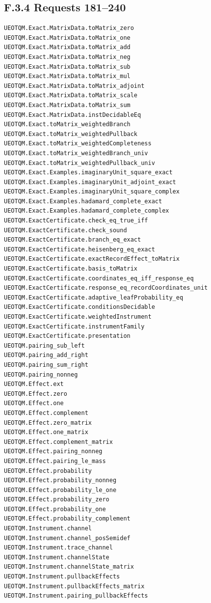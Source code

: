 \documentclass[
  11pt,
  oneside]{book}
\begin{document}
\subsection{F.3.4 Requests 181--240}

\begin{Verbatim}[breaklines,breakanywhere,fontsize=\scriptsize]
UEOTQM.Exact.MatrixData.toMatrix_zero
UEOTQM.Exact.MatrixData.toMatrix_one
UEOTQM.Exact.MatrixData.toMatrix_add
UEOTQM.Exact.MatrixData.toMatrix_neg
UEOTQM.Exact.MatrixData.toMatrix_sub
UEOTQM.Exact.MatrixData.toMatrix_mul
UEOTQM.Exact.MatrixData.toMatrix_adjoint
UEOTQM.Exact.MatrixData.toMatrix_scale
UEOTQM.Exact.MatrixData.toMatrix_sum
UEOTQM.Exact.MatrixData.instDecidableEq
UEOTQM.Exact.toMatrix_weightedBranch
UEOTQM.Exact.toMatrix_weightedPullback
UEOTQM.Exact.toMatrix_weightedCompleteness
UEOTQM.Exact.toMatrix_weightedBranch_univ
UEOTQM.Exact.toMatrix_weightedPullback_univ
UEOTQM.Exact.Examples.imaginaryUnit_square_exact
UEOTQM.Exact.Examples.imaginaryUnit_adjoint_exact
UEOTQM.Exact.Examples.imaginaryUnit_square_complex
UEOTQM.Exact.Examples.hadamard_complete_exact
UEOTQM.Exact.Examples.hadamard_complete_complex
UEOTQM.ExactCertificate.check_eq_true_iff
UEOTQM.ExactCertificate.check_sound
UEOTQM.ExactCertificate.branch_eq_exact
UEOTQM.ExactCertificate.heisenberg_eq_exact
UEOTQM.ExactCertificate.exactRecordEffect_toMatrix
UEOTQM.ExactCertificate.basis_toMatrix
UEOTQM.ExactCertificate.coordinates_eq_iff_response_eq
UEOTQM.ExactCertificate.response_eq_recordCoordinates_unit
UEOTQM.ExactCertificate.adaptive_leafProbability_eq
UEOTQM.ExactCertificate.conditionsDecidable
UEOTQM.ExactCertificate.weightedInstrument
UEOTQM.ExactCertificate.instrumentFamily
UEOTQM.ExactCertificate.presentation
UEOTQM.pairing_sub_left
UEOTQM.pairing_add_right
UEOTQM.pairing_sum_right
UEOTQM.pairing_nonneg
UEOTQM.Effect.ext
UEOTQM.Effect.zero
UEOTQM.Effect.one
UEOTQM.Effect.complement
UEOTQM.Effect.zero_matrix
UEOTQM.Effect.one_matrix
UEOTQM.Effect.complement_matrix
UEOTQM.Effect.pairing_nonneg
UEOTQM.Effect.pairing_le_mass
UEOTQM.Effect.probability
UEOTQM.Effect.probability_nonneg
UEOTQM.Effect.probability_le_one
UEOTQM.Effect.probability_zero
UEOTQM.Effect.probability_one
UEOTQM.Effect.probability_complement
UEOTQM.Instrument.channel
UEOTQM.Instrument.channel_posSemidef
UEOTQM.Instrument.trace_channel
UEOTQM.Instrument.channelState
UEOTQM.Instrument.channelState_matrix
UEOTQM.Instrument.pullbackEffects
UEOTQM.Instrument.pullbackEffects_matrix
UEOTQM.Instrument.pairing_pullbackEffects
\end{Verbatim}
\end{document}
